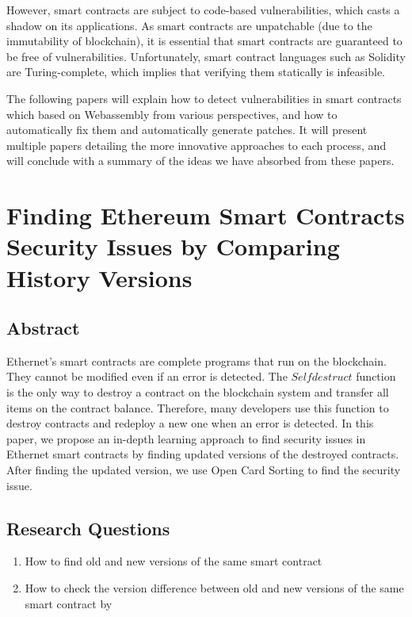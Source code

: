 \documentclass[a4paper, 10pt, conference, twocolumn]{ieeeconf}       %
\begin{document}
However, smart contracts are subject to code-based vulnerabilities, which casts a shadow on its applications.
As smart contracts are unpatchable (due to the immutability of blockchain), it is essential that smart contracts are guaranteed to be free of vulnerabilities.
Unfortunately, smart contract languages such as Solidity are Turing-complete, which implies that verifying them statically is infeasible.

The following papers will explain how to detect vulnerabilities in smart contracts  which based on Webassembly from various perspectives, and how to automatically fix them and automatically generate patches.
It will present multiple papers detailing the more innovative approaches to each process, and will conclude with a summary of the ideas we have absorbed from these papers.

\section{Finding Ethereum Smart Contracts Security Issues by Comparing History Versions}\cite{Chen2020FindingES}

\subsection{Abstract}

Ethernet's smart contracts are complete programs that run on the blockchain.
They cannot be modified even if an error is detected.
The $Selfdestruct$ function is the only way to destroy a contract on the blockchain system and transfer all items on the contract balance.
Therefore, many developers use this function to destroy contracts and redeploy a new one when an error is detected.
In this paper, we propose an in-depth learning approach to find security issues in Ethernet smart contracts by finding updated versions of the destroyed contracts.
After finding the updated version, we use Open Card Sorting to find the security issue.

\subsection{Research Questions}

\begin{enumerate}
    \item How to find old and new versions of the same smart contract
    \item How to check the version difference between old and new versions of the same smart contract by
\end{enumerate}
\end{document}
